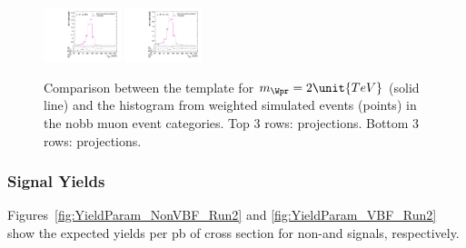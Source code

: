 \begin{figure}[htpb]
  \includegraphics[width=0.2\textwidth]{fig/analysisAppendix/templateVsReco_VBFWprToWZ2000_r0_MJ_mu_HP_vbf_HDy.pdf}
  \includegraphics[width=0.2\textwidth]{fig/analysisAppendix/templateVsReco_VBFWprToWZ2000_r0_MJ_mu_LP_vbf_HDy.pdf}\\
  \caption{
    Comparison between the \VBF\WprtoWZ template for $m_{\Wpr}=2\unit{TeV}$ (solid line) and the histogram from weighted simulated events (points) in the nobb muon event categories.
    Top 3 rows: \MVV projections.
    Bottom 3 rows: \MJ projections.
  }
  \label{fig:1dtemplateVsReco_VBFWprToWZ2000}
\end{figure}

\subsubsection{Signal Yields}

Figures~\ref{fig:YieldParam_NonVBF_Run2} and \ref{fig:YieldParam_VBF_Run2} show the expected yields per pb of cross section for non-\VBF and \VBF signals, respectively.

